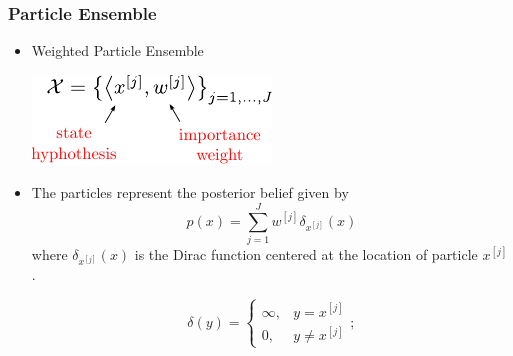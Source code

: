 \begin{frame}
    \frametitle{Particle Ensemble}
    
    \begin{itemize}
        \item Weighted Particle Ensemble
        
        \begin{center}
            \includegraphics[width=0.5\columnwidth]{./images/particle_filter/weighted_samples.pdf}
        \end{center}
        
        \item The particles represent the posterior belief given by
            \begin{equation*}
                p(x) = \sum_{j=1}^{J} w^{[j]} \delta_{x^{[j]}}(x)
            \end{equation*}
            where $\delta_{x^{[j]}}(x)$ is the Dirac function centered at the location of particle $x^{[j]}$.
            
            \begin{equation*}
                \delta(y) =
                \begin{cases}
                \infty, & y = x^{[j]} \\
                0, & y \neq x^{[j]}
                \end{cases};
            \end{equation*}
        
            
    
    \end{itemize}
    
\end{frame}


